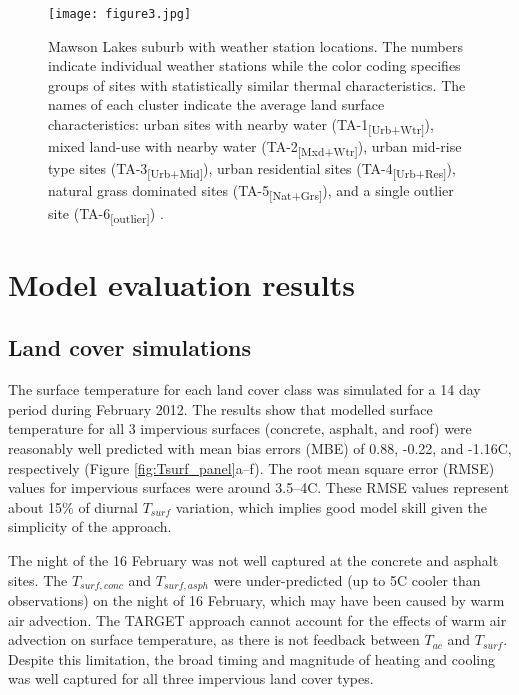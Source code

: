 \documentclass[journal abbreviation, manuscript]{copernicus}
\begin{document}
\begin{figure}[!htbp]
\begin{center}
\texttt{[image: figure3.jpg]}
 \caption{Mawson Lakes suburb with weather station locations. The numbers indicate individual weather stations while the color coding specifies groups of sites with statistically similar thermal characteristics.  The  names of each cluster indicate the average land surface characteristics: urban sites with nearby water ({TA-1\textsubscript{[Urb+Wtr]}}), mixed land-use with nearby water ({TA-2\textsubscript{[Mxd+Wtr]}}), urban mid-rise type sites ({TA-3\textsubscript{[Urb+Mid]}}), urban residential sites ({TA-4\textsubscript{[Urb+Res]}}), natural grass dominated sites ({TA-5\textsubscript{[Nat+Grs]}}), and a single outlier site (TA-6\textsubscript{[outlier]})  \citep{Broadbent2017}.} \label{fig:mawson}
\end{center} 
\end{figure}




\section{Model evaluation results}\label{sec:Results} 
\subsection{Land cover simulations}\label{sec:landcoverresult} 


The surface temperature for each land cover class was simulated for a 14 day period during February 2012. The results show that modelled surface temperature for all 3 impervious surfaces (concrete, asphalt, and roof) were reasonably well predicted with mean bias errors (MBE) of 0.88, -0.22, and -1.16\degree C, respectively (Figure \ref{fig:Tsurf_panel}a--f). The root mean square error (RMSE) values for impervious surfaces were around 3.5--4\degree C. These RMSE values represent about 15\% of diurnal $T_{surf}$ variation, which implies good model skill given the simplicity of the approach.  



The night of the 16 February was not well captured at the concrete and asphalt sites. The $T_{surf,conc}$ and $T_{surf,asph}$ were under-predicted (up to 5\degree C cooler than observations) on the night of 16 February, which may have been caused by warm air advection. The TARGET approach  cannot account for the effects of warm air advection on surface temperature, as there is not feedback between $T_{ac}$ and $T_{surf}$.  Despite this limitation, the broad timing and magnitude of heating and cooling was well captured for all three impervious land cover types. 
\end{document}
